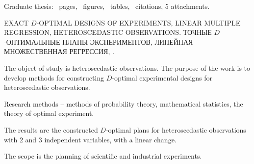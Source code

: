 Graduate thesis: \ pages, \totalfigures{}~figures, \totaltables{}\ tables,
\ citations, 5 attachments.

\vspace{\baselineskip}

EXACT $D$-OPTIMAL DESIGNS OF EXPERIMENTS, LINEAR MULTIPLE REGRESSION, HETEROSCEDASTIC OBSERVATIONS.
ТОЧНЫЕ $D$-ОПТИМАЛЬНЫЕ ПЛАНЫ ЭКСПЕРИМЕНТОВ, ЛИНЕЙНАЯ МНОЖЕСТВЕННАЯ РЕГРЕССИЯ, .

\vspace{\baselineskip}

The object of study is heteroscedastic observations. The purpose of the work is to develop methods for constructing $D$-optimal experimental designs for heteroscedastic observations.

Research methods -- methods of probability theory, mathematical
statistics, the theory of optimal experiment.

The results are the constructed $D$-optimal plans for heteroscedastic observations with 2 and 3 independent variables, with a linear change.

The scope is the planning of scientific and industrial experiments.
